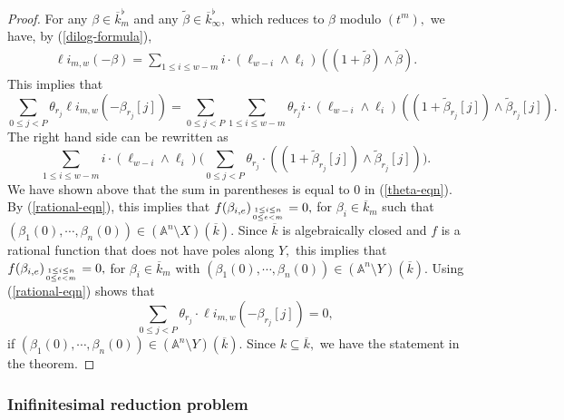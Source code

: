\documentclass{amsart}
\theoremstyle{definition}
\numberwithin{equation}{subsection}
\begin{document}
\begin{proof}
 
For any  $\beta \in \overline{k}_m ^{\flat}$ and any $\tilde{\beta} \in \overline{k}_{\infty} ^{\flat},$ which  reduces to  $\beta $ modulo $(t^m),$ we have, by (\ref{dilog-formula}),
\begin{align}\label{lifting-indentity-0}
\ell i _{m,w}(-\beta)=\sum_{1 \leq i \leq w - m} i \cdot (\ell_{w - i} \land \ell_i)((1+\tilde{\beta}) \wedge \tilde{\beta}).    
\end{align}
This implies that  
$$
\sum _{0\leq j <P} \theta_{r_j}\ell i _{m,w}(-\beta_{r_j}[j])=\sum _{0\leq j <P} \sum _{1\leq i \leq w-m}\theta_{r_j} i \cdot (\ell_{w - i} \land \ell_i)((1+\tilde{\beta}_{r_j}[j]) \wedge \tilde{\beta}_{r_j}[j]).
$$
The right hand side can be rewritten as 
$$
 \sum _{1\leq i \leq w-m}i \cdot (\ell_{w - i} \land \ell_i)\Big ( \sum _{0\leq j <P}\theta_{r_j}\cdot ((1+\tilde{\beta}_{r_j}[j]) \wedge \tilde{\beta}_{r_j}[j])\Big).
$$
We have shown above that the sum in parentheses is equal to 0 in (\ref{theta-eqn}). By (\ref{rational-eqn}), this implies that $f(\beta_{i,e})_{{1\leq i \leq n} \atop {0\leq e <m}} =0,$ for $\beta_{i} \in \overline{k}_{m}$ such that $(\beta_1(0),\cdots, \beta_{n}(0)) \in (\mathbb{A} ^n \setminus X)(\overline{k}).$ Since $\overline{k}$ is algebraically closed and  $f$ is a rational function that does not have poles along $Y, $ this implies that $f(\beta_{i,e})_{{1\leq i \leq n} \atop {0\leq e <m}} =0,$ for $\beta_{i} \in \overline{k}_{m}$ with $(\beta_1(0),\cdots, \beta_{n}(0)) \in (\mathbb{A} ^n \setminus Y)(\overline{k}).$ Using (\ref{rational-eqn}) shows that 
$$
\sum _{0\leq j <P} \theta_{r_j}\cdot \ell i _{m,w}(-\beta_{r_j}[j])=0,
$$
if $(\beta_{1}(0),\cdots, \beta_{n}(0)) \in (\mathbb{A}^{n}\setminus Y)(\overline{k}).$ Since $k\subseteq \overline{k},$ we have the statement in the theorem. 
\end{proof}


 
\subsubsection{Inifinitesimal reduction problem }

\end{document}
